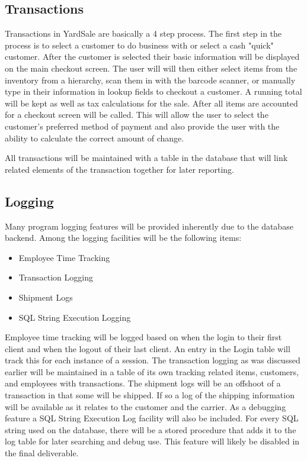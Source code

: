 \documentclass{book}
\begin{document}
\subsection{Transactions}

Transactions in YardSale are basically a 4 step process. The first step in the process is to select a customer to do business with or select a cash "quick" customer. After the customer is selected their basic information will be displayed on the main checkout screen. The user will will then either select items from the inventory from a hierarchy, scan them in with the barcode scanner, or manually type in their information in lookup fields to checkout a customer. A running total will be kept as well as tax calculations for the sale. After all items are accounted for a checkout screen will be called. This will allow the user to select the customer's preferred method of payment and also provide the user with the ability to calculate the correct amount of change.

All transactions will be maintained with a table in the database that will link related elements of the transaction together for later reporting.

\subsection{Logging}

Many program logging features will be provided inherently due to the database backend. Among the logging facilities will be the following items:

\begin{itemize}
\item {Employee Time Tracking}
\item {Transaction Logging}
\item {Shipment Logs}
\item {SQL String Execution Logging}
\end{itemize}

Employee time tracking will be logged based on when the login to their first client and when the logout of their last client. An entry in the Login table will track this for each instance of a session. The transaction logging as was discussed earlier will be maintained in a table of its own tracking related items, customers, and employees with transactions. The shipment logs will be an offshoot of a transaction in that some will be shipped. If so a log of the shipping information will be available as it relates to the customer and the carrier. As a debugging feature a SQL String Execution Log facility will also be included. For every SQL string used on the database, there will be a stored procedure that adds it to the log table for later searching and debug use. This feature will likely be disabled in the final deliverable.
\end{document}
